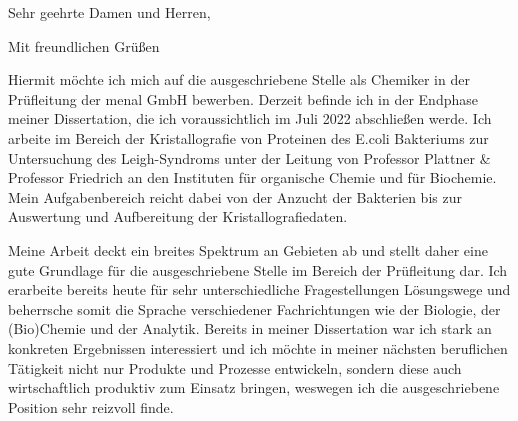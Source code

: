 

\date{\today}
\opening{Sehr geehrte Damen und Herren,}
\closing{Mit freundlichen Grüßen}
{}
\makelettertitle
\justifying

Hiermit möchte ich mich auf die ausgeschriebene Stelle als Chemiker in der Prüfleitung der menal GmbH bewerben. Derzeit befinde ich in der Endphase meiner Dissertation, die ich voraussichtlich im Juli 2022 abschließen werde. Ich arbeite im Bereich der Kristallografie von Proteinen des E.coli Bakteriums zur Untersuchung des Leigh-Syndroms unter der Leitung von Professor Plattner \& Professor Friedrich an den Instituten für organische Chemie und für Biochemie. Mein Aufgabenbereich reicht dabei von der Anzucht der Bakterien bis zur Auswertung und Aufbereitung der Kristallografiedaten.\par
Meine Arbeit deckt ein breites Spektrum an Gebieten ab und stellt daher eine gute Grundlage für die ausgeschriebene Stelle im Bereich der Prüfleitung dar. Ich erarbeite bereits heute für sehr unterschiedliche Fragestellungen Lösungswege und beherrsche somit die Sprache verschiedener Fachrichtungen wie der Biologie, der (Bio)Chemie und der Analytik. Bereits in meiner Dissertation war ich stark an konkreten Ergebnissen interessiert und ich möchte in meiner nächsten beruflichen Tätigkeit nicht nur Produkte und Prozesse entwickeln, sondern diese auch wirtschaftlich produktiv zum Einsatz bringen, weswegen ich die ausgeschriebene Position sehr reizvoll finde.\par


